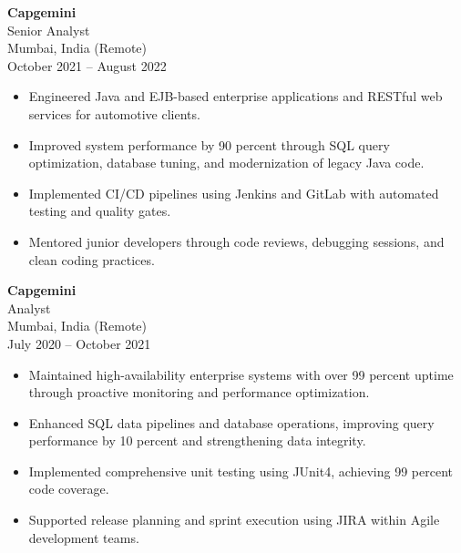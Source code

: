 \documentclass[letterpaper,12pt]{article}
\begin{document}
\vspace{4pt}

\textbf{Capgemini} \\
Senior Analyst \\
Mumbai, India (Remote) \\
October 2021 -- August 2022
\begin{itemize}
  \item Engineered Java and EJB-based enterprise applications and RESTful web services for automotive clients.
  \item Improved system performance by 90 percent through SQL query optimization, database tuning, and modernization of legacy Java code.
  \item Implemented CI/CD pipelines using Jenkins and GitLab with automated testing and quality gates.
  \item Mentored junior developers through code reviews, debugging sessions, and clean coding practices.
\end{itemize}

\vspace{4pt}

\textbf{Capgemini} \\
Analyst \\
Mumbai, India (Remote) \\
July 2020 -- October 2021
\begin{itemize}
  \item Maintained high-availability enterprise systems with over 99 percent uptime through proactive monitoring and performance optimization.
  \item Enhanced SQL data pipelines and database operations, improving query performance by 10 percent and strengthening data integrity.
  \item Implemented comprehensive unit testing using JUnit4, achieving 99 percent code coverage.
  \item Supported release planning and sprint execution using JIRA within Agile development teams.
\end{itemize}

\vspace{6pt}


\end{document}
